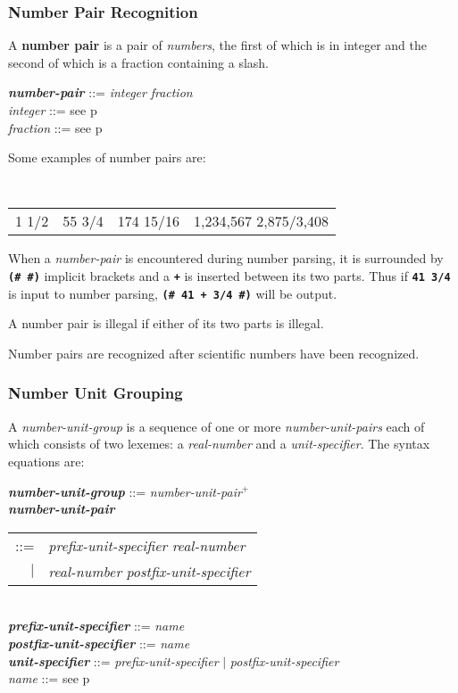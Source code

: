 \documentclass[12pt]{article}
\newcommand{\TT}[1]{{\tt \bfseries #1}}
\newcommand{\key}[1]{{\rm \bfseries #1}}
\newcommand{\emkey}[1]{{\em \bfseries #1}}
\newcommand{\pagref}[1]{p\pageref{#1}}
\newcommand{\PLUS}[1][]{{$^{+#1}$}}
\newenvironment{indpar}[1][0.3in]%
	{\begin{list}{}%
		     {\setlength{\itemsep}{0in}%
		      \setlength{\topsep}{0in}%
		      \setlength{\parsep}{1ex}%
		      \setlength{\labelwidth}{#1}%
		      \setlength{\leftmargin}{#1}%
		      \addtolength{\leftmargin}{\labelsep}}%
	 \item}%
	{\end{list}}
\begin{document}
\subsubsection{Number Pair Recognition}
\label{NUMBER-PAIR-RECOGNITION}

A \key{number pair} is a pair of {\em numbers}, the first
of which is in integer and the second of which is a fraction
containing a slash.

\begin{indpar}
\emkey{number-pair} ::= {\em integer} {\em fraction}
    \\[1ex]
{\em integer} ::= see \pagref{INTEGER} \\[1ex]
{\em fraction} ::= see \pagref{FRACTION}
\end{indpar}

Some examples of number pairs are:

\begin{indpar}[0.1in]
\tt
\begin{tabular}{l@{~~~~~}l@{~~~~~}l@{~~~~~}l}
1 1/2	& 55 3/4	& 174 15/16  & 1,234,567 2,875/3,408
\end{tabular}
\end{indpar}

When a {\em number-pair} is encountered during number parsing,
it is surrounded by \TT{(\# \#)} implicit brackets and a \TT{+} is
inserted between its two parts.  Thus if
\TT{41 3/4} is input to number parsing,
\TT{(\# 41 + 3/4 \#)}
will be output.

A number pair is illegal if either of its two parts is illegal.

Number pairs are recognized after scientific numbers have been
recognized.

\subsubsection{Number Unit Grouping}
\label{NUMBER-UNIT-GROUPING}

A {\em number-unit-group} is a sequence of one or more {\em number-unit-pairs}
each of which consists of two lexemes: a {\em real-number}
and a {\em unit-specifier}.
The syntax equations are:

\begin{indpar}
\emkey{number-unit-group} ::= {\em number-unit-pair}\PLUS{} \\[1ex]
\emkey{number-unit-pair} \begin{tabular}[t]{r@{~}l}
                     ::= & {\em prefix-unit-specifier} {\em real-number} \\
                     $|$ & {\em real-number} {\em postfix-unit-specifier} \\
		     \end{tabular} \\[1ex]
\emkey{prefix-unit-specifier} ::= {\em name} \\[1ex]
\emkey{postfix-unit-specifier} ::= {\em name} \\[1ex]
\emkey{unit-specifier} ::= {\em prefix-unit-specifier} $|$
                         {\em postfix-unit-specifier} \\[1ex]
{\em name} ::= see \pagref{NAME}
\end{indpar}
\end{document}
